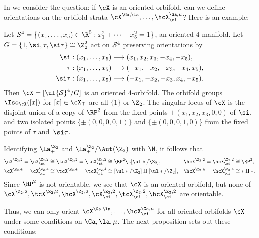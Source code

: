 \documentclass{article}
\begin{document}
In \cite[\S 8.4]{Joyc6} we consider the question: if $\cX$ is an
oriented orbifold, can we define orientations on the orbifold
strata $\cX^{\Ga,\la},\ldots,\hcX^{\Ga,\mu}_\ci$? Here is an
example:

\begin{ex} Let ${\cal S}^4=\bigl\{(x_1,\ldots,x_5)\in\R^5:
x_1^2+\cdots+x_5^2=1\bigr\}$, an oriented 4-manifold. Let
$G=\{1,\si,\tau,\si\tau\}\cong\Z_2^2$ act on ${\cal S}^4$ preserving
orientations by
\begin{align*}
\si:(x_1,\ldots,x_5)&\longmapsto (x_1,x_2,x_3,-x_4,-x_5),\\
\tau:(x_1,\ldots,x_5)&\longmapsto (-x_1,-x_2,-x_3,-x_4,x_5),\\
\si\tau:(x_1,\ldots,x_5)&\longmapsto (-x_1,-x_2,-x_3,x_4,-x_5).
\end{align*}
Then $\cX=[\ul{\cal S}^4/G]$ is an oriented 4-orbifold. The orbifold
groups $\Iso_\cX([x])$ for $[x]\in\cX_\top$ are all $\{1\}$ or
$\Z_2$. The singular locus of $\cX$ is the disjoint union of a copy
of $\RP^2$ from the fixed points $\pm(x_1,x_2,x_3,0,0)$ of $\si$,
and two isolated points $\{\pm(0,0,0,0,1)\}$ and
$\{\pm(0,0,0,1,0)\}$ from the fixed points of $\tau$ and~$\si\tau$.

Identifying $\La_+^{\Z_2}$ and $\La_+^{\Z_2}/\Aut(\Z_2)$ with $\N$,
it follows that
\begin{align*}
\cX^{\Z_2,2}&=\cX^{\Z_2,2}_\ci\cong \tcX^{\Z_2,2}=
\tcX^{\Z_2,2}_\ci\cong\RP^2\t[\ul */\Z_2],&
\hcX^{\Z_2,2}&=\hcX^{\Z_2,2}_\ci\cong\RP^2,\\
\cX^{\Z_2,4}&=\cX^{\Z_2,4}_\ci\cong \tcX^{\Z_2,4}
=\tcX^{\Z_2,4}_\ci\cong[\ul */\Z_2]\amalg [\ul */\Z_2],&
\hcX^{\Z_2,4}&=\hcX^{\Z_2,4}_\ci\cong *\amalg *.
\end{align*}
Since $\RP^2$ is not orientable, we see that $\cX$ is an oriented
orbifold, but none of $\cX^{\Z_2,2},\tcX^{\Z_2,2},
\hcX^{\Z_2,2},\cX^{\Z_2,2}_\ci,\tcX^{\Z_2,2}_\ci, \hcX^{\Z_2,2}_\ci$
are orientable.
\label{ds9ex2}
\end{ex}

Thus, we can only orient $\cX^{\Ga,\la},\ldots, \hcX^{\Ga,\mu}_\ci$
for all oriented orbifolds $\cX$ under some conditions on
$\Ga,\la,\mu$. The next proposition sets out these conditions:
\end{document}
